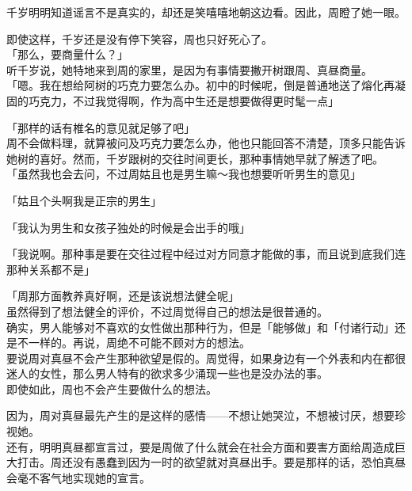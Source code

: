 千岁明明知道谣言不是真实的，却还是笑嘻嘻地朝这边看。因此，周瞪了她一眼。

即使这样，千岁还是没有停下笑容，周也只好死心了。\\

「那么，要商量什么？」\\

听千岁说，她特地来到周的家里，是因为有事情要撇开树跟周、真昼商量。\\

「嗯。我在想给阿树的巧克力要怎么办。初中的时候呢，倒是普通地送了熔化再凝固的巧克力，不过我觉得啊，作为高中生还是想要做得更时髦一点」

「那样的话有椎名的意见就足够了吧」\\

周不会做料理，就算被问及巧克力要怎么办，他也只能回答不清楚，顶多只能告诉她树的喜好。然而，千岁跟树的交往时间更长，那种事情她早就了解透了吧。\\

「虽然我也会去问，不过周姑且也是男生嘛～我也想要听听男生的意见」

「姑且个头啊我是正宗的男生」

「我认为男生和女孩子独处的时候是会出手的哦」

「我说啊。那种事是要在交往过程中经过对方同意才能做的事，而且说到底我们连那种关系都不是」

「周那方面教养真好啊，还是该说想法健全呢」\\

虽然得到了想法健全的评价，不过周觉得自己的想法是很普通的。\\

确实，男人能够对不喜欢的女性做出那种行为，但是「能够做」和「付诸行动」还是不一样的。再说，周绝不可能不顾对方的想法。\\

要说周对真昼不会产生那种欲望是假的。周觉得，如果身边有一个外表和内在都很迷人的女性，那么男人特有的欲求多少涌现一些也是没办法的事。\\

即使如此，周也不会产生要做什么的想法。

因为，周对真昼最先产生的是这样的感情——不想让她哭泣，不想被讨厌，想要珍视她。\\

还有，明明真昼都宣言过，要是周做了什么就会在社会方面和要害方面给周造成巨大打击。周还没有愚蠢到因为一时的欲望就对真昼出手。要是那样的话，恐怕真昼会毫不客气地实现她的宣言。\\

